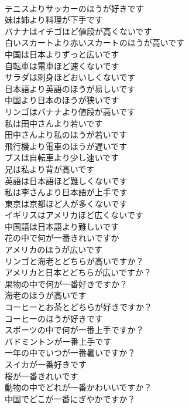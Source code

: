 \documentclass[8pt]{extreport}
\begin{document}
\begin{CJK}{UTF8}{min}
\\	テニスよりサッカーのほうが好きです	
\\	妹は姉より料理が下手です	
\\	バナナはイチゴほど値段が高くないです	
\\	白いスカートより赤いスカートのほうが高いです	
\\	中国は日本よりずっと広いです	
\\	自転車は電車ほど速くないです	
\\	サラダは刺身ほどおいしくないです	
\\	日本語より英語のほうが易しいです	
\\	中国より日本のほうが狭いです	
\\	リンゴはバナナより値段が高いです	
\\	私は田中さんより若いです	
\\	田中さんより私のほうが若いです	
\\	飛行機より電車のほうが遅いです	
\\	ブスは自転車より少し速いです	
\\	兄は私より背が高いです	
\\	英語は日本語ほど難しくないです	
\\	私は李さんより日本語が上手です	
\\	東京は京都ほど人が多くないです	
\\	イギリスはアメリカほど広くないです	
\\	中国語は日本語より難しいです	
\\	花の中で何が一番きれいですか	
\\	アメリカのほうが広いです	
\\	リンゴと海老とどちらが高いですか？	
\\	アメリカと日本とどちらが広いですか？	
\\	果物の中で何が一番好きですか？	
\\	海老のほうが高いです	
\\	コーヒーとお茶とどちらが好きですか？	
\\	コーヒーのほうが好きです	
\\	スポーツの中で何が一番上手ですか？	
\\	バドミントンが一番上手です	
\\	一年の中でいつが一番暑いですか？	
\\	スイカが一番好きです	
\\	桜が一番きれいです	
\\	動物の中でどれが一番かわいいですか？	
\\	中国でどこが一番にぎやかですか？	

\end{CJK}
\end{document}
